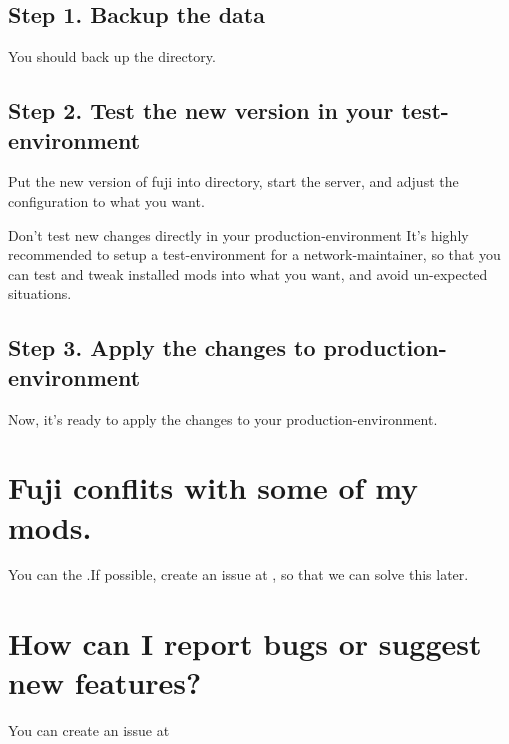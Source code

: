 \subsection{Step 1. Backup the data}
You should back up the  directory.

\subsection{Step 2. Test the new version in your test-environment}
Put the new version of fuji into  directory, start the server, and adjust the configuration to what you want.

\begin{warn}{Don't test new changes directly in your production-environment}
    It's highly recommended to setup a test-environment for a network-maintainer, so that you can test and tweak installed mods into what you want, and avoid un-expected situations.
\end{warn}

\subsection{Step 3. Apply the changes to production-environment}
Now, it's ready to apply the changes to your production-environment.


\section{Fuji conflits with some of my mods.}
You can  the .If possible, create an issue at \issueurl, so that we can solve this later.


\section{How can I report bugs or suggest new features?}
You can create an issue at \issueurl



